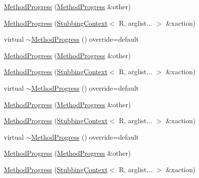 \begin{DoxyCompactItemize}
\item 
\mbox{\hyperlink{structfakeit_1_1WhenFunctor_1_1MethodProgress_a1a3992d9bc7c283acb9aa657ab207fc1}{Method\+Progress}} (\mbox{\hyperlink{structfakeit_1_1WhenFunctor_1_1MethodProgress}{Method\+Progress}} \&other)
\item 
\mbox{\hyperlink{structfakeit_1_1WhenFunctor_1_1MethodProgress_ab62da1d9cf787ea91795f61f3b76ac25}{Method\+Progress}} (\mbox{\hyperlink{structfakeit_1_1StubbingContext}{Stubbing\+Context}}$<$ R, arglist... $>$ \&xaction)
\item 
virtual \mbox{\hyperlink{structfakeit_1_1WhenFunctor_1_1MethodProgress_a5bdc18cb6924dc88bc110a15aac37455}{$\sim$\+Method\+Progress}} () override=default
\item 
\mbox{\hyperlink{structfakeit_1_1WhenFunctor_1_1MethodProgress_a1a3992d9bc7c283acb9aa657ab207fc1}{Method\+Progress}} (\mbox{\hyperlink{structfakeit_1_1WhenFunctor_1_1MethodProgress}{Method\+Progress}} \&other)
\item 
\mbox{\hyperlink{structfakeit_1_1WhenFunctor_1_1MethodProgress_ab62da1d9cf787ea91795f61f3b76ac25}{Method\+Progress}} (\mbox{\hyperlink{structfakeit_1_1StubbingContext}{Stubbing\+Context}}$<$ R, arglist... $>$ \&xaction)
\item 
virtual \mbox{\hyperlink{structfakeit_1_1WhenFunctor_1_1MethodProgress_a5bdc18cb6924dc88bc110a15aac37455}{$\sim$\+Method\+Progress}} () override=default
\item 
\mbox{\hyperlink{structfakeit_1_1WhenFunctor_1_1MethodProgress_a1a3992d9bc7c283acb9aa657ab207fc1}{Method\+Progress}} (\mbox{\hyperlink{structfakeit_1_1WhenFunctor_1_1MethodProgress}{Method\+Progress}} \&other)
\item 
\mbox{\hyperlink{structfakeit_1_1WhenFunctor_1_1MethodProgress_ab62da1d9cf787ea91795f61f3b76ac25}{Method\+Progress}} (\mbox{\hyperlink{structfakeit_1_1StubbingContext}{Stubbing\+Context}}$<$ R, arglist... $>$ \&xaction)
\item 
virtual \mbox{\hyperlink{structfakeit_1_1WhenFunctor_1_1MethodProgress_a5bdc18cb6924dc88bc110a15aac37455}{$\sim$\+Method\+Progress}} () override=default
\item 
\mbox{\hyperlink{structfakeit_1_1WhenFunctor_1_1MethodProgress_a1a3992d9bc7c283acb9aa657ab207fc1}{Method\+Progress}} (\mbox{\hyperlink{structfakeit_1_1WhenFunctor_1_1MethodProgress}{Method\+Progress}} \&other)
\item 
\mbox{\hyperlink{structfakeit_1_1WhenFunctor_1_1MethodProgress_ab62da1d9cf787ea91795f61f3b76ac25}{Method\+Progress}} (\mbox{\hyperlink{structfakeit_1_1StubbingContext}{Stubbing\+Context}}$<$ R, arglist... $>$ \&xaction)

\end{DoxyCompactItemize}
